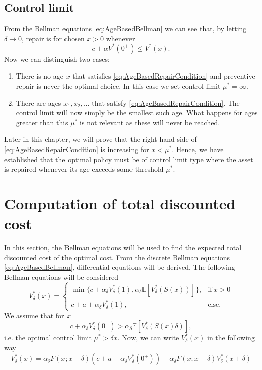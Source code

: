 \documentclass[a4paper]{thesis}
\theoremstyle{definition}
\begin{document}
\subsection{Control limit}\label{section:AgeBasedControlLimit}
From the Bellman equations \eqref{eq:AgeBasedBellman} we can see that, by letting $\delta\rightarrow 0$, repair is for chosen $x>0$ whenever
\begin{equation}\label{eq:AgeBasedRepairCondition}
 c+\alpha V^*(0^+) \leq V^*(x). 
 \end{equation}
Now we can distinguish two cases:
\begin{enumerate}
	\item There is no age $x$ that satisfies \eqref{eq:AgeBasedRepairCondition} and preventive repair is never the optimal choice.
	In this case we set control limit $\mu^*=\infty$.
	\item There are ages $x_1,x_2,...$ that satisfy \eqref{eq:AgeBasedRepairCondition}.
	The control limit will now simply be the smallest such age.
	What happens for ages greater than this $\mu^*$ is not relevant as these will never be reached.
\end{enumerate}
Later in this chapter, we will prove that the right hand side of \eqref{eq:AgeBasedRepairCondition} is increasing for $x<\mu^*$.
Hence, we have established that the optimal policy must be of control limit type where the asset is repaired whenever its age exceeds some threshold $\mu^*$. \section{Computation of total discounted cost}
In this section, the Bellman equations will be used to find the expected total discounted cost of the optimal cost.
From the discrete Bellman equations \eqref{eq:AgeBasedBellman}, differential equations will be derived.
The following Bellman equations will be considered
\[V_\delta^*(x)=\begin{cases}
\min\{c+\alpha_\delta V^*_\delta(1),\alpha_\delta \mathbb{E}[V^*_\delta(S(x))]\},&\text{if}\ x>0 \\
c+a+\alpha_\delta V^*_\delta(1),&\text{else.}
\end{cases}\]
We assume that for $x$
$$
c+\alpha_\delta V^*_\delta(0^+)>\alpha_\delta \mathbb{E}[V^*_\delta(S(x)\delta)],
$$
i.e. the optimal control limit $\mu^*>\delta x$.
Now, we can write $V^*_\delta(x)$ in the following way
\[V^*_\delta(x)=\alpha_\delta \bar F(x;x-\delta) (c+a+\alpha_\delta V^*_\delta(0^+))
+\alpha_\delta \bar F(x;x-\delta)V^*_\delta(x+\delta)
\]
\end{document}
